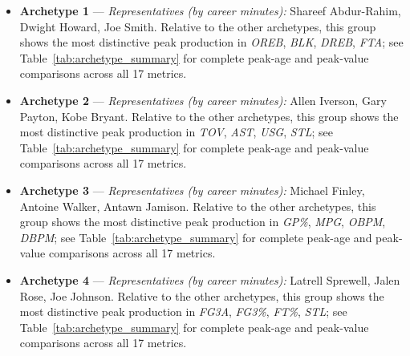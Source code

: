 \begin{itemize}
\item \textbf{Archetype 1} --- \emph{Representatives (by career minutes):} Shareef Abdur-Rahim, Dwight Howard, Joe Smith. Relative to the other archetypes, this group shows the most distinctive peak production in \textit{OREB}, \textit{BLK}, \textit{DREB}, \textit{FTA}; see Table~\ref{tab:archetype_summary} for complete peak-age and peak-value comparisons across all 17 metrics.
\item \textbf{Archetype 2} --- \emph{Representatives (by career minutes):} Allen Iverson, Gary Payton, Kobe Bryant. Relative to the other archetypes, this group shows the most distinctive peak production in \textit{TOV}, \textit{AST}, \textit{USG}, \textit{STL}; see Table~\ref{tab:archetype_summary} for complete peak-age and peak-value comparisons across all 17 metrics.
\item \textbf{Archetype 3} --- \emph{Representatives (by career minutes):} Michael Finley, Antoine Walker, Antawn Jamison. Relative to the other archetypes, this group shows the most distinctive peak production in \textit{GP\%}, \textit{MPG}, \textit{OBPM}, \textit{DBPM}; see Table~\ref{tab:archetype_summary} for complete peak-age and peak-value comparisons across all 17 metrics.
\item \textbf{Archetype 4} --- \emph{Representatives (by career minutes):} Latrell Sprewell, Jalen Rose, Joe Johnson. Relative to the other archetypes, this group shows the most distinctive peak production in \textit{FG3A}, \textit{FG3\%}, \textit{FT\%}, \textit{STL}; see Table~\ref{tab:archetype_summary} for complete peak-age and peak-value comparisons across all 17 metrics.
\end{itemize}
